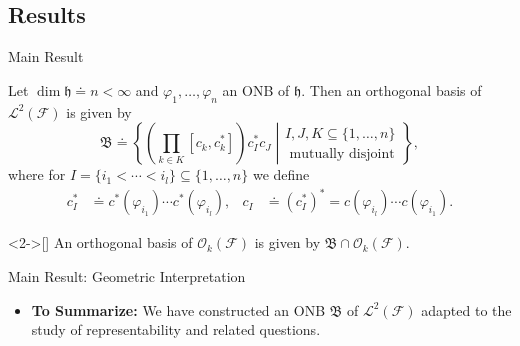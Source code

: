 \documentclass{beamer}
\newcommand{\HS}{{\mathcal{L}^2(\FockSpace)}}
\newcommand{\HSbasis}{\mathfrak{B}}
\newcommand{\HilbertSpace}{\ensuremath{\mathfrak{h}}}
\newcommand{\FockSpace}{\mathcal{F}}
\newcommand{\DensityMatrices}{\mathcal{DM}}
\newcommand{\kbOp}[1][k]{{\ensuremath{\mathcal{O}_{#1}(\mathcal{F})}}}
\begin{document}
\subsection{Results}
\begin{frame}{Main Result}
    \begin{theorem}
        Let $\dim\HilbertSpace\doteq n<\infty$ and $\varphi_1,\ldots,\varphi_n$ an ONB of $\HilbertSpace$.
        Then an orthogonal basis of $\HS$ is given by
        \begin{equation}
            \HSbasis\doteq\left\{
            \left.\left(\prod_{k\in K}\left[c_k,c_k^*\right]\right)c_I^*c_J\;\right|
            \begin{gathered}
                I,J,K\subseteq\{1,\ldots,n\}\\\text{ mutually disjoint}
            \end{gathered}
            \right\},
        \end{equation}
        where for $I=\{i_1<\cdots<i_l\}\subseteq\{1,\ldots,n\}$ we define
        \begin{align}
            c_I^*&\doteq c^*(\varphi_{i_1})\cdots c^*(\varphi_{i_l}),&
            c_I&\doteq\left(c_I^*\right)^*=c(\varphi_{i_l})\cdots c(\varphi_{i_1}).
        \end{align}
    \end{theorem}
    \begin{theorem}<2->[\cite{Bach2018}]
        An orthogonal basis of $\kbOp$ is given by $\HSbasis\cap\kbOp$.
    \end{theorem}
\end{frame}

\begin{frame}{Main Result: Geometric Interpretation}
    \begin{itemize}
        \item \textbf{To Summarize:} We have constructed an ONB $\mathfrak{B}$ of
        $\HS$ adapted to the study of representability and related questions.
    \end{itemize}
    \begin{figure}
\end{figure}
\end{frame}
\end{document}

